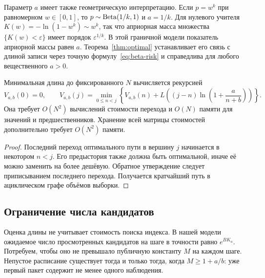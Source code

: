 Параметр $a$ имеет также геометрическую интерпретацию. Если $p=w^k$ при
равномерном $w\in[0,1]$, то $p\sim\operatorname{Beta}(1/k,1)$ и $a=1/k$.
Для нулевого учителя $K(w)=-\ln(1-w^k)\sim w^k$, так что априорная масса
множества $\{K(w)<\varepsilon\}$ имеет порядок $\varepsilon^{1/k}$.
В этой граничной модели показатель априорной массы равен $a$.
Теорема~\ref{thm:optimal} устанавливает его связь с длиной записи через
точную формулу~\eqref{eq:beta-risk} и справедлива для любого вещественного
$a>0$.

\begin{proposition}
\label{prop:dp}
Минимальная длина до фиксированного $N$ вычисляется рекурсией
\begin{equation}
 V_{a,b}(0)=0,\qquad
 V_{a,b}(j)=\min_{0\le n<j}
 \left\{V_{a,b}(n)+L\left((j-n)\ln\left(1+\frac a{n+b}\right)\right)\right\}.
 \label{eq:dp}
\end{equation}
Она требует $O(N^2)$ вычислений стоимости перехода и $O(N)$ памяти для
значений и предшественников. Хранение всей матрицы стоимостей дополнительно
требует $O(N^2)$ памяти.
\end{proposition}
\begin{proof}
Последний переход оптимального пути в вершину $j$ начинается в некотором
$n<j$. Его предыстория также должна быть оптимальной, иначе её можно заменить
на более дешёвую. Обратное утверждение следует приписыванием последнего
перехода. Получается кратчайший путь в ациклическом графе объёмов выборки.
\end{proof}

\subsection{Ограничение числа кандидатов}

Оценка длины не учитывает стоимость поиска индекса. В нашей модели ожидаемое
число просмотренных кандидатов на шаге в точности равно $e^{BK_n}$.
Потребуем, чтобы оно не превышало публичную константу $M$ на каждом шаге.
Непустое расписание существует тогда и только тогда, когда
$M\ge1+a/b$: уже первый пакет содержит не менее одного наблюдения.

